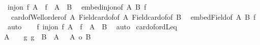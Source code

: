 \begin{isabellebody}
\ {\isachardoublequoteopen}inj{\isacharunderscore}{\kern0pt}on\ f\ A\ {\isasymand}\ f\ {\isacharbackquote}{\kern0pt}\ A\ {\isasymle}\ B{\isachardoublequoteclose}\ \isamarkupfalse%
\ embed{\isacharunderscore}{\kern0pt}inj{\isacharunderscore}{\kern0pt}on{\isacharbrackleft}{\kern0pt}of\ {\isachardoublequoteopen}{\isacharbar}{\kern0pt}A{\isacharbar}{\kern0pt}{\isachardoublequoteclose}\ {\isachardoublequoteopen}{\isacharbar}{\kern0pt}B{\isacharbar}{\kern0pt}{\isachardoublequoteclose}\ f{\isacharbrackright}{\kern0pt}\isanewline
\ \ card{\isacharunderscore}{\kern0pt}of{\isacharunderscore}{\kern0pt}Well{\isacharunderscore}{\kern0pt}order{\isacharbrackleft}{\kern0pt}of\ {\isachardoublequoteopen}A{\isachardoublequoteclose}{\isacharbrackright}{\kern0pt}\ Field{\isacharunderscore}{\kern0pt}card{\isacharunderscore}{\kern0pt}of{\isacharbrackleft}{\kern0pt}of\ {\isachardoublequoteopen}A{\isachardoublequoteclose}{\isacharbrackright}{\kern0pt}\ Field{\isacharunderscore}{\kern0pt}card{\isacharunderscore}{\kern0pt}of{\isacharbrackleft}{\kern0pt}of\ {\isachardoublequoteopen}B{\isachardoublequoteclose}{\isacharbrackright}{\kern0pt}\isanewline
\ \ embed{\isacharunderscore}{\kern0pt}Field{\isacharbrackleft}{\kern0pt}of\ {\isachardoublequoteopen}{\isacharbar}{\kern0pt}A{\isacharbar}{\kern0pt}{\isachardoublequoteclose}\ {\isachardoublequoteopen}{\isacharbar}{\kern0pt}B{\isacharbar}{\kern0pt}{\isachardoublequoteclose}\ f{\isacharbrackright}{\kern0pt}\ \isamarkupfalse%
\ auto\isanewline
\ \ \isamarkupfalse%
\ {\isachardoublequoteopen}{\isasymexists}f{\isachardot}{\kern0pt}\ inj{\isacharunderscore}{\kern0pt}on\ f\ A\ {\isasymand}\ f\ {\isacharbackquote}{\kern0pt}\ A\ {\isasymle}\ B{\isachardoublequoteclose}\ \isamarkupfalse%
\ auto\isanewline
{}\isamarkupfalse%
%
\endisatagproof
{\isafoldproof}%
%
\isadelimproof
\isanewline
%
\endisadelimproof
\isanewline
{}\isamarkupfalse%
\ card{\isacharunderscore}{\kern0pt}of{\isacharunderscore}{\kern0pt}ordLeq{}{\isacharcolon}{\kern0pt}\isanewline
{\isachardoublequoteopen}A\ {\isasymnoteq}\ {\isacharbraceleft}{\kern0pt}{\isacharbraceright}{\kern0pt}\ {\isasymLongrightarrow}\ {\isacharparenleft}{\kern0pt}{\isasymexists}g{\isachardot}{\kern0pt}\ g\ {\isacharbackquote}{\kern0pt}\ B\ {\isacharequal}{\kern0pt}\ A{\isacharparenright}{\kern0pt}\ {\isacharequal}{\kern0pt}\ {\isacharparenleft}{\kern0pt}\ {\isacharbar}{\kern0pt}A{\isacharbar}{\kern0pt}\ {\isasymle}o\ {\isacharbar}{\kern0pt}B{\isacharbar}{\kern0pt}\ {\isacharparenright}{\kern0pt}{\isachardoublequoteclose}\isanewline

\end{isabellebody}
